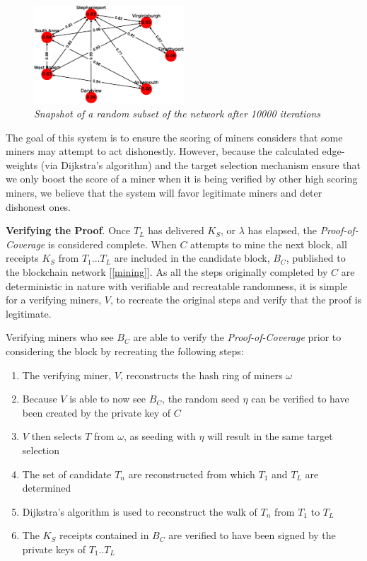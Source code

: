 \documentclass[letterpaper,11pt]{article}
\begin{document}
\begin{figure}[H]
    \begin{center}
          \includegraphics[width=0.5\textwidth]{graph10000.eps}
          \caption{\emph{Snapshot of a random subset of the network after 10000 iterations}}
          \label{fig:score-graph10000}
     \end{center}
\end{figure}

The goal of this system is to ensure the scoring of miners considers that some miners may attempt to act dishonestly. However, because the calculated edge-weights (via Dijkstra's algorithm) and the target selection mechanism ensure that we only boost the score of a miner when it is being verified by other high scoring miners, we believe that the system will favor legitimate miners and deter dishonest ones.

\textbf{Verifying the Proof}. Once $T_L$ has delivered $K_S$, or $\lambda$ has elapsed, the \emph{Proof-of-Coverage} is considered complete. When $C$ attempts to mine the next block, all receipts $K_S$ from $T_1$...$T_L$ are included in the candidate block, $B_C$, published to the blockchain network [\ref{mining}]. As all the steps originally completed by $C$ are deterministic in nature with verifiable and recreatable randomness, it is simple for a verifying miners, $V$, to recreate the original steps and verify that the proof is legitimate.

Verifying miners who see $B_C$ are able to verify the \emph{Proof-of-Coverage} prior to considering the block by recreating the following steps:

\begin{enumerate}
        \item The verifying miner, $V$, reconstructs the hash ring of miners $\omega$
        \item Because $V$ is able to now see $B_C$, the random seed $\eta$ can be verified to have been created by the private key of $C$
        \item $V$ then selects $T$ from $\omega$, as seeding with $\eta$ will result in the same target selection
        \item The set of candidate $T_n$ are reconstructed from which $T_1$ and $T_L$ are determined
        \item Dijkstra's algorithm is used to reconstruct the walk of $T_n$ from $T_1$ to $T_L$
        \item The $K_S$ receipts contained in $B_C$ are verified to have been signed by the private keys of $T_1$..$T_L$
\end{enumerate}
\end{document}
